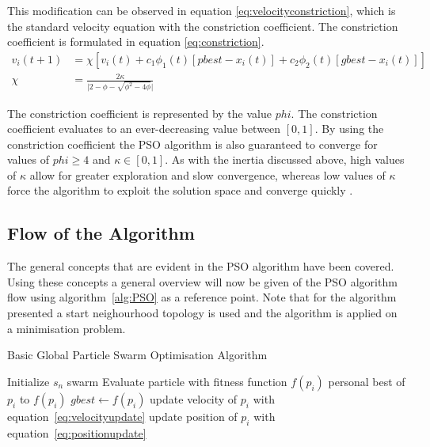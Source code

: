 This modification can be observed in equation \ref{eq:velocityconstriction}, which is the standard velocity equation with the constriction coefficient. The constriction coefficient is formulated in equation \ref{eq:constriction}\cite{adaptPSO,FundamentalSwarm,CompuIntelligenceIntro}.
\begin{align}
v_i(t+1) &= \chi[v_i(t) + c_1\phi_{1}(t)[pbest - x_i(t)] + c_2\phi_{2}(t)[gbest - x_i(t)]]\label{eq:velocityconstriction}\\
\chi &= \frac{2\kappa}{\lvert 2 - \phi - \sqrt{\phi^2 - 4\phi}\rvert}\label{eq:constriction}
\end{align}

The constriction coefficient is represented by the value $phi$. The constriction coefficient evaluates to an ever-decreasing value between $[0,1]$. By using the constriction coefficient the PSO algorithm is also guaranteed to converge for values of $phi \geq 4$ and $\kappa \in [0,1]$. As with the inertia discussed above, high values of $\kappa$ allow for greater exploration and slow convergence, whereas low values of $\kappa$ force the algorithm to exploit the solution space and converge quickly \cite{adaptPSO,FundamentalSwarm,CompuIntelligenceIntro}.

\subsection{Flow of the Algorithm}
The general concepts that are evident in the PSO algorithm have been covered. Using these concepts a general overview will now be given of the PSO algorithm flow using algorithm~\ref{alg:PSO} as a reference point. Note that for the algorithm presented a start neighourhood topology is used and the algorithm is applied on a minimisation problem.
\begin{algorithm}[H]
\caption{Basic Global Particle Swarm Optimisation Algorithm\cite{CompuIntelligenceIntro}}
\label{alg:PSO}
	\begin{algorithmic}[1]
		\State Initialize $s_n$ swarm
				\State Evaluate particle with fitness function $f(p_i)$
					\State personal best of $p_i$ to $f(p_i)$
				\EndIf
					\State $gbest \leftarrow f(p_i)$
				\EndIf
			\EndFor
				\State update velocity of $p_i$ with equation~\ref{eq:velocityupdate}
				\State update position of $p_i$ with equation~\ref{eq:positionupdate}
			\EndFor
		\EndWhile
	\end{algorithmic}
\end{algorithm}

